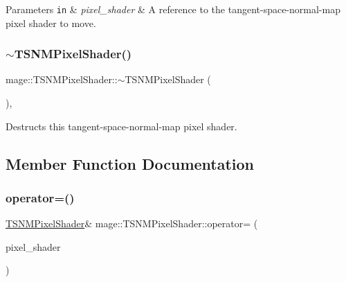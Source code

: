 \begin{DoxyParams}[1]{Parameters}
\mbox{\tt in}  & {\em pixel\+\_\+shader} & A reference to the tangent-\/space-\/normal-\/map pixel shader to move. \\
\hline
\end{DoxyParams}
\hypertarget{classmage_1_1_t_s_n_m_pixel_shader_ae7c20ffb872faffb28714b39916e4250}{}\label{classmage_1_1_t_s_n_m_pixel_shader_ae7c20ffb872faffb28714b39916e4250} 
\subsubsection{\texorpdfstring{$\sim$\+T\+S\+N\+M\+Pixel\+Shader()}{~TSNMPixelShader()}}
{\footnotesize\ttfamily mage\+::\+T\+S\+N\+M\+Pixel\+Shader\+::$\sim$\+T\+S\+N\+M\+Pixel\+Shader (\begin{DoxyParamCaption}{ }\end{DoxyParamCaption})\hspace{0.3cm}{\ttfamily [virtual]}, {\ttfamily [default]}}

Destructs this tangent-\/space-\/normal-\/map pixel shader. 

\subsection{Member Function Documentation}
\hypertarget{classmage_1_1_t_s_n_m_pixel_shader_a8c9bc92d544b088e9530f8f47df2b4a6}{}\label{classmage_1_1_t_s_n_m_pixel_shader_a8c9bc92d544b088e9530f8f47df2b4a6} 
\subsubsection{\texorpdfstring{operator=()}{operator=()}\hspace{0.1cm}{\footnotesize\ttfamily [1/2]}}
{\footnotesize\ttfamily \hyperlink{classmage_1_1_t_s_n_m_pixel_shader}{T\+S\+N\+M\+Pixel\+Shader}\& mage\+::\+T\+S\+N\+M\+Pixel\+Shader\+::operator= (\begin{DoxyParamCaption}\item[{const \hyperlink{classmage_1_1_t_s_n_m_pixel_shader}{T\+S\+N\+M\+Pixel\+Shader} \&}]{pixel\+\_\+shader }\end{DoxyParamCaption})\hspace{0.3cm}{\ttfamily [delete]}}


